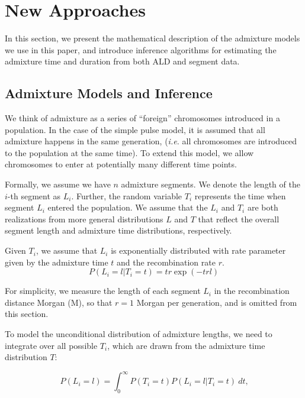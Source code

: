 \documentclass[]{article}
\begin{document}
\section{New Approaches}\label{new approaches}

In this section, we present the mathematical description of the admixture models we use in this paper, and introduce inference algorithms for estimating the admixture time and duration from both ALD and segment data. 

\subsection{Admixture Models and Inference}\label{admixture models}

We think of admixture as a series of ``foreign'' chromosomes introduced in a population. In the case of the simple pulse model, it is assumed that all admixture happens in the same generation, (\emph{i.e.} all chromosomes are introduced to the population at the same time). To extend this model, we allow chromosomes to enter at potentially many different time points.

Formally, we assume we have $n$ admixture segments. We denote the length of the $i$-th segment as $L_i$. Further, the random variable $T_i$ represents the time when segment $L_i$ entered the population. We assume that the $L_i$ and $T_i$ are both realizations from more general distributions $L$ and $T$ that reflect the overall segment length and admixture time distributions, respectively. 

Given $T_i$, we assume that $L_i$ is exponentially distributed with rate parameter given by the admixture time $t$ and the recombination rate $r$.
\begin{equation}
\label{eq:generall_length_distribution}
    P(L_i=l|T_i=t) = t r\exp{(-t r l)} 
\end{equation}

For simplicity, we measure the length of each segment $L_i$ in the recombination distance Morgan (M), so that $r=1$ Morgan per generation, and is omitted from this section.

To model the unconditional distribution of admixture lengths, we need to integrate over all possible $T_i$, which are drawn from the admixture time distribution $T$:

\begin{equation}
\label{eq:standard_likelihood_definintion}
    P(L_i=l)=\int_{0}^{\infty} P(T_i=t) P(L_i=l | T_i=t) \ dt \text{,}
\end{equation}
\end{document}
